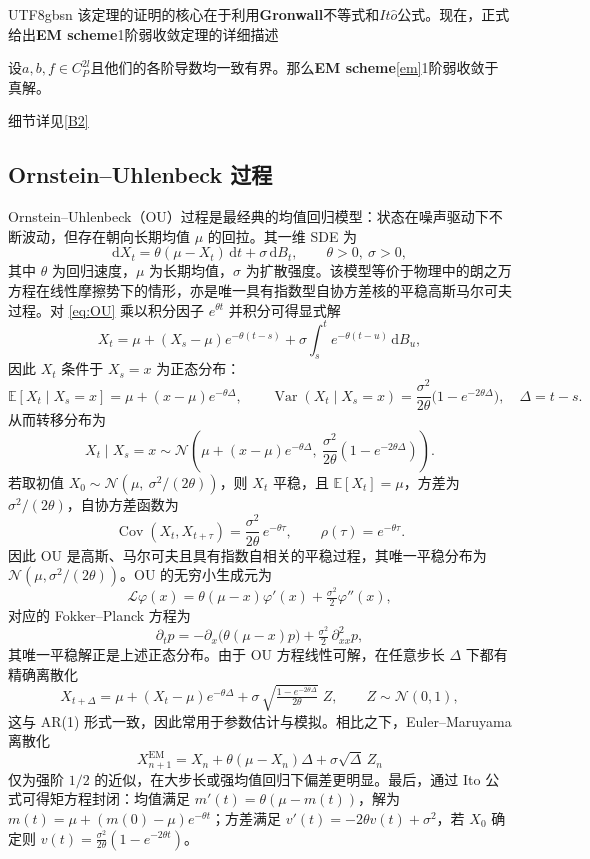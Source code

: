 \documentclass{article}
\begin{document}
\begin{CJK*}{UTF8}{gbsn}
该定理的证明的核心在于利用\textbf{Gronwall}不等式和$It\hat{o}$公式。现在，正式给出\textbf{EM scheme}1阶弱收敛定理的详细描述

\begin{theorem}
    设$a,b,f\in C_P^{2l}$且他们的各阶导数均一致有界。那么\textbf{EM scheme}\ref{em}1阶弱收敛于真解。
\end{theorem}
细节详见\ref{B2}

\subsection{Ornstein--Uhlenbeck 过程}

Ornstein--Uhlenbeck（OU）过程是最经典的均值回归模型：状态在噪声驱动下不断波动，但存在朝向长期均值 $\mu$ 的回拉。其一维 SDE 为
\begin{equation}\label{eq:OU}
  \mathrm{d}X_t=\theta(\mu-X_t)\,\mathrm{d}t+\sigma\,\mathrm{d}B_t,
  \qquad \theta>0,\ \sigma>0,
\end{equation}
其中 $\theta$ 为回归速度，$\mu$ 为长期均值，$\sigma$ 为扩散强度。该模型等价于物理中的朗之万方程在线性摩擦势下的情形，亦是唯一具有指数型自协方差核的平稳高斯马尔可夫过程。对 \eqref{eq:OU} 乘以积分因子 $e^{\theta t}$ 并积分可得显式解
\[
  X_t=\mu + (X_s-\mu)e^{-\theta (t-s)}+\sigma\!\int_s^t e^{-\theta (t-u)}\,\mathrm{d}B_u,
\]
因此 $X_t$ 条件于 $X_s=x$ 为正态分布：
\[
  \mathbb{E}[X_t\mid X_s=x] = \mu + (x-\mu)e^{-\theta\Delta},\qquad
  \operatorname{Var}(X_t\mid X_s=x) = \frac{\sigma^2}{2\theta}\bigl(1-e^{-2\theta\Delta}\bigr),\quad \Delta=t-s.
\]
从而转移分布为
\[
  X_t\mid X_s=x \sim \mathcal{N}\!\left(\mu+(x-\mu)e^{-\theta\Delta},\ \frac{\sigma^2}{2\theta}(1-e^{-2\theta\Delta})\right).
\]
若取初值 $X_0\sim \mathcal{N}(\mu,\ \sigma^2/(2\theta))$，则 $X_t$ 平稳，且 $\mathbb{E}[X_t]=\mu$，方差为 $\sigma^2/(2\theta)$，自协方差函数为
\[
  \operatorname{Cov}(X_t,X_{t+\tau})=\frac{\sigma^2}{2\theta}\,e^{-\theta \tau},\qquad \rho(\tau)=e^{-\theta \tau}.
\]
因此 OU 是高斯、马尔可夫且具有指数自相关的平稳过程，其唯一平稳分布为 $\mathcal{N}(\mu,\sigma^2/(2\theta))$。OU 的无穷小生成元为
\[
  \mathcal{L}\varphi(x)=\theta(\mu-x)\varphi'(x)+\tfrac{\sigma^2}{2}\varphi''(x),
\]
对应的 Fokker--Planck 方程为
\[
  \partial_t p = -\partial_x\!\big(\theta(\mu-x)p\big)+\tfrac{\sigma^2}{2}\,\partial_{xx}^2 p,
\]
其唯一平稳解正是上述正态分布。由于 OU 方程线性可解，在任意步长 $\Delta$ 下都有精确离散化
\[
  X_{t+\Delta}=\mu+(X_t-\mu)e^{-\theta\Delta}
  +\sigma\,\sqrt{\tfrac{1-e^{-2\theta\Delta}}{2\theta}}\;Z,\qquad Z\sim\mathcal{N}(0,1),
\]
这与 AR(1) 形式一致，因此常用于参数估计与模拟。相比之下，Euler--Maruyama 离散化
\[
  X_{n+1}^{\text{EM}}=X_n+\theta(\mu-X_n)\Delta+\sigma\sqrt{\Delta}\,Z_n
\]
仅为强阶 $1/2$ 的近似，在大步长或强均值回归下偏差更明显。最后，通过 Ito 公式可得矩方程封闭：均值满足 $m'(t)=\theta(\mu-m(t))$，解为 $m(t)=\mu+(m(0)-\mu)e^{-\theta t}$；方差满足 $v'(t)=-2\theta v(t)+\sigma^2$，若 $X_0$ 确定则 $v(t)=\frac{\sigma^2}{2\theta}(1-e^{-2\theta t})$。


\end{CJK*}
\end{document}
